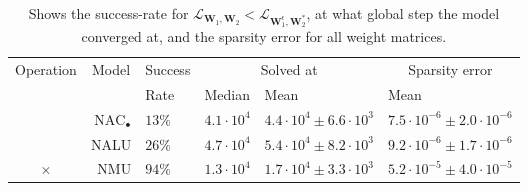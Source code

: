 \begin{table}[h]

\caption{\label{tab:very-simple-function-results}Shows the success-rate for $\mathcal{L}_{\mathbf{W}_1, \mathbf{W}_2} < \mathcal{L}_{\mathbf{W}_1^\epsilon, \mathbf{W}_2^*}$, at what global step the model converged at, and the sparsity error for all weight matrices.}
\centering
\begin{tabular}{crllll}
\toprule
\multicolumn{1}{c}{Operation} & \multicolumn{1}{c}{Model} & \multicolumn{1}{c}{Success} & \multicolumn{2}{c}{Solved at} & \multicolumn{1}{c}{Sparsity error} \\
\cmidrule(l{3pt}r{3pt}){1-1} \cmidrule(l{3pt}r{3pt}){2-2} \cmidrule(l{3pt}r{3pt}){3-3} \cmidrule(l{3pt}r{3pt}){4-5} \cmidrule(l{3pt}r{3pt}){6-6}
 &  & Rate & Median & Mean & Mean\\
\midrule
 & ${\mathrm{NAC}_\bullet}$ & $13\%$ & $4.1 \cdot 10^{4}$ & $4.4 \cdot 10^{4} \pm 6.6 \cdot 10^{3}$ & $7.5 \cdot 10^{-6} \pm 2.0 \cdot 10^{-6}$\\

 & NALU & $26\%$ & $4.7 \cdot 10^{4}$ & $5.4 \cdot 10^{4} \pm 8.2 \cdot 10^{3}$ & $9.2 \cdot 10^{-6} \pm 1.7 \cdot 10^{-6}$\\

\multirow{-3}{*}{\centering\arraybackslash $\bm{\times}$} & NMU & $94\%$ & $1.3 \cdot 10^{4}$ & $1.7 \cdot 10^{4} \pm 3.3 \cdot 10^{3}$ & $5.2 \cdot 10^{-5} \pm 4.0 \cdot 10^{-5}$\\
\bottomrule
\end{tabular}
\end{table}
